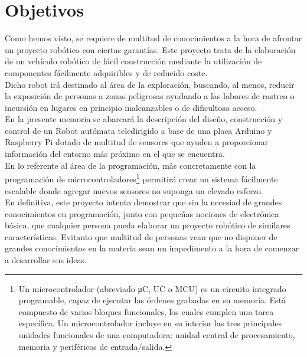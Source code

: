 

\section{Objetivos}
\label{sec:objetivos}

Como hemos visto, se requiere de multitud de conocimientos a la hora de afrontar un proyecto robótico con ciertas garantías. Este proyecto trata de la elaboración 
de un vehículo robótico de fácil construcción mediante la utilización de componentes fácilmente adquiribles y de reducido coste.\\

Dicho robot irá destinado al área de la exploración, buscando, al menos, reducir la exposición de personas a zonas peligrosas ayudando a las labores de rastreo 
o incursión en lugares en principio inalcanzables o de dificultoso acceso.\\

En la presente memoria se abarcará la descripción del diseño, construcción y control de un Robot autómata teledirigido a base de una placa Arduino y Raspberry Pi dotado de multitud de sensores que ayuden a proporcionar 
información del entorno más próximo en el que se encuentra.\\

En lo referente al área de la programación, más concretamente con la programación de microcontroladores\footnote{Un microcontrolador (abreviado μC, UC o MCU) es un circuito integrado programable, capaz de 
ejecutar las órdenes grabadas en su memoria. Está compuesto de varios bloques funcionales, los cuales cumplen una tarea específica. Un microcontrolador incluye en su interior las
tres principales unidades funcionales de una computadora: unidad central de procesamiento, memoria y periféricos de entrada/salida. } permitirá crear un sistema fácilmente escalable
donde agregar nuevos sensores no suponga un elevado esferzo.\\

En definitiva, este proyecto intenta demostrar que sin la necesiad de grandes conocimientos en programación, junto con pequeñas nociones de electrónica básica, que cualquier
persona pueda elaborar un proyecto robótico de similares características. Evitanto que multitud de personas vean que no disponer de grandes conocimientos en la materia sean un
impedimento a la hora de comenzar a desarrollar sus ideas.\\


